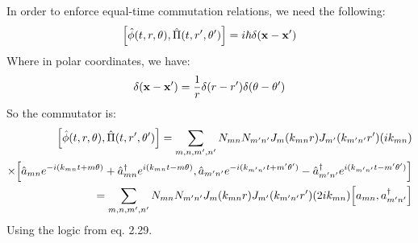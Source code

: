 \documentclass[12pt]{article}
\begin{document}
In order to enforce equal-time commutation relations, we need the following:
\begin{align*}
  \comm{\hat\phi(t,r,\theta)}{\hat\Pi(t,r',\theta')}=i\hbar\delta(\vb{x-x}')
\end{align*}
Where in polar coordinates, we have:
\begin{align*}
  \delta(\vb{x-x}')=\frac1r\delta(r-r')\delta(\theta-\theta')
\end{align*}
So the commutator is:
\begin{align*}
  \comm{\hat\phi(t,r,\theta)}{\hat\Pi(t,r',\theta')}
  =\sum_{m,n,m',n'}N_{mn}N_{m'n'}J_{m}(k_{mn}r)J_{m'}(k_{m'n'}r')(ik_{mn})\\
  \times\comm
  {\hat{a}_{mn}e^{-i(k_{mn}t+m\theta)}
    +\hat{a}^\dag_{mn}e^{i(k_{mn}t-m\theta)}}
  {\hat{a}_{m'n'}e^{-i(k_{m'n'}t+m'\theta')}
    -\hat{a}^\dag_{m'n'}e^{i(k_{m'n'}t-m'\theta')}}\\
  =\sum_{m,n,m',n'}N_{mn}N_{m'n'}J_{m}(k_{mn}r)J_{m'}(k_{m'n'}r')(2ik_{mn})
  \comm{a_{mn}}{a_{m'n'}^\dag}
\end{align*}
Using the logic from eq. 2.29.
\end{document}
